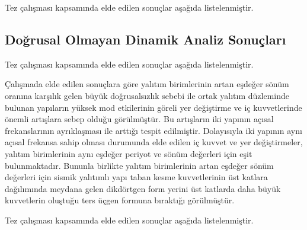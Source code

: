 Tez çalışması kapsamında elde edilen sonuçlar aşağıda listelenmiştir. 

\subsection{Doğrusal Olmayan Dinamik Analiz Sonuçları}

Tez çalışması kapsamında elde edilen sonuçlar aşağıda listelenmiştir. 

Çalışmada elde edilen sonuçlara göre yalıtım birimlerinin artan eşdeğer
sönüm oranına karşılık gelen büyük doğrusalsızlık sebebi ile ortak
yalıtım düzleminde bulunan yapıların yüksek mod etkilerinin göreli
yer değiştirme ve iç kuvvetlerinde önemli artışlara sebep olduğu görülmüştür.
Bu artışların iki yapının açısal frekanslarının ayrıklaşması ile arttığı
tespit edilmiştir. Dolayısıyla iki yapının aynı açısal frekansa sahip
olması durumunda elde edilen iç kuvvet ve yer değiştirmeler, yalıtım
birimlerinin aynı eşdeğer periyot ve sönüm değerleri için eşit bulunmaktadır.
Bununla birlikte yalıtım birimlerinin artan eşdeğer sönüm değerleri
için sismik yalıtımlı yapı taban kesme kuvvetlerinin üst katlara dağılımında
meydana gelen dikdörtgen form yerini üst katlarda daha büyük kuvvetlerin
oluştuğu ters üçgen formuna bıraktığı görülmüştür.

Tez çalışması kapsamında elde edilen sonuçlar aşağıda listelenmiştir. 
